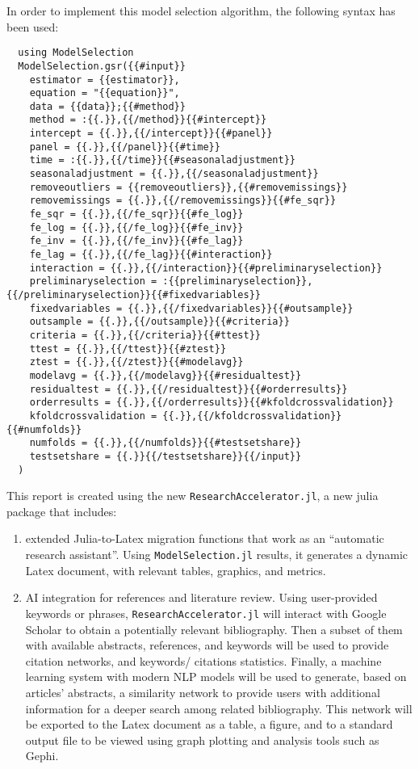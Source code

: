 \documentclass{article}
\begin{document}
In order to implement this model selection algorithm, the following syntax has been used:

\begin{lstlisting} 
  using ModelSelection
  ModelSelection.gsr({{#input}}
    estimator = {{estimator}},
    equation = "{{equation}}",
    data = {{data}};{{#method}}
    method = :{{.}},{{/method}}{{#intercept}}
    intercept = {{.}},{{/intercept}}{{#panel}}
    panel = {{.}},{{/panel}}{{#time}}
    time = :{{.}},{{/time}}{{#seasonaladjustment}}
    seasonaladjustment = {{.}},{{/seasonaladjustment}}
    removeoutliers = {{removeoutliers}},{{#removemissings}}
    removemissings = {{.}},{{/removemissings}}{{#fe_sqr}}
    fe_sqr = {{.}},{{/fe_sqr}}{{#fe_log}}
    fe_log = {{.}},{{/fe_log}}{{#fe_inv}}
    fe_inv = {{.}},{{/fe_inv}}{{#fe_lag}}
    fe_lag = {{.}},{{/fe_lag}}{{#interaction}}
    interaction = {{.}},{{/interaction}}{{#preliminaryselection}}
    preliminaryselection = :{{preliminaryselection}},{{/preliminaryselection}}{{#fixedvariables}}
    fixedvariables = {{.}},{{/fixedvariables}}{{#outsample}}
    outsample = {{.}},{{/outsample}}{{#criteria}}
    criteria = {{.}},{{/criteria}}{{#ttest}}
    ttest = {{.}},{{/ttest}}{{#ztest}}
    ztest = {{.}},{{/ztest}}{{#modelavg}}
    modelavg = {{.}},{{/modelavg}}{{#residualtest}}
    residualtest = {{.}},{{/residualtest}}{{#orderresults}}
    orderresults = {{.}},{{/orderresults}}{{#kfoldcrossvalidation}}
    kfoldcrossvalidation = {{.}},{{/kfoldcrossvalidation}}{{#numfolds}}
    numfolds = {{.}},{{/numfolds}}{{#testsetshare}}
    testsetshare = {{.}}{{/testsetshare}}{{/input}}
  )
\end{lstlisting}

This report is created using the new \verb|ResearchAccelerator.jl|, a new julia package that includes:
\begin{enumerate}
  \item extended Julia-to-Latex migration functions that work as an “automatic research assistant”. Using \verb|ModelSelection.jl| results, it generates a dynamic Latex document, with relevant tables, graphics, and metrics.
  
  \item AI integration for references and literature review. Using user-provided keywords or phrases, \verb|ResearchAccelerator.jl| will interact with Google Scholar to obtain a potentially relevant bibliography. Then a subset of them with available abstracts, references, and keywords will be used to provide citation networks, and keywords/ citations statistics. Finally, a machine learning system with modern NLP models will be used to generate, based on articles’ abstracts, a similarity network to provide users with additional information for a deeper search among related bibliography. This network will be exported to the Latex document as a table, a figure, and to a standard output file to be viewed using graph plotting and analysis tools such as Gephi.
\end{enumerate}
\end{document}

